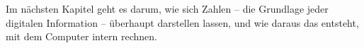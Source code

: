 
Im nächsten Kapitel geht es darum, wie sich Zahlen -- die Grundlage jeder digitalen Information -- überhaupt darstellen lassen, und wie daraus das  entsteht, mit dem Computer intern rechnen.